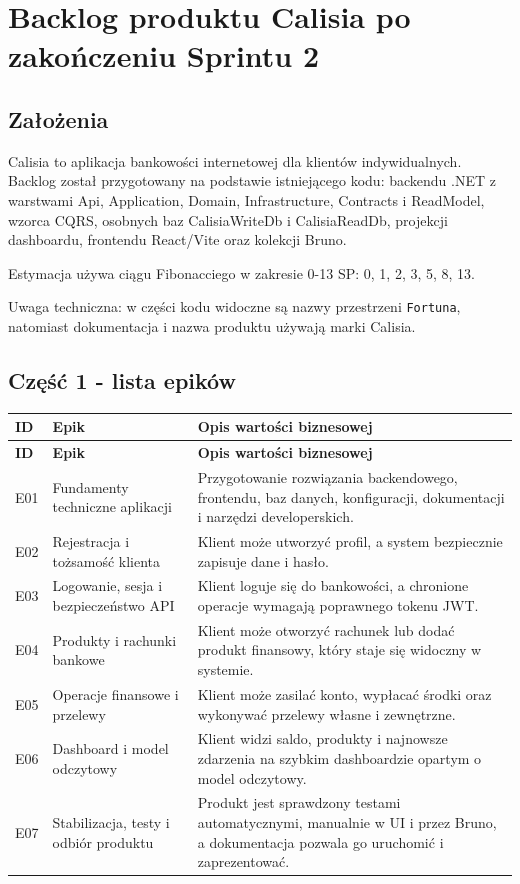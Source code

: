\documentclass[12pt,a4paper]{article}
\begin{document}
\section*{Backlog produktu Calisia po zakończeniu Sprintu 2}

\subsection*{Założenia}

Calisia to aplikacja bankowości internetowej dla klientów indywidualnych. Backlog został przygotowany na podstawie istniejącego kodu: backendu .NET z warstwami Api, Application, Domain, Infrastructure, Contracts i ReadModel, wzorca CQRS, osobnych baz CalisiaWriteDb i CalisiaReadDb, projekcji dashboardu, frontendu React/Vite oraz kolekcji Bruno.

Estymacja używa ciągu Fibonacciego w zakresie 0-13 SP: 0, 1, 2, 3, 5, 8, 13.

Uwaga techniczna: w części kodu widoczne są nazwy przestrzeni \texttt{Fortuna}, natomiast dokumentacja i nazwa produktu używają marki Calisia.

\subsection*{Część 1 - lista epików}

\begingroup
\footnotesize
{}
\begin{longtable}{@{}L{0.10\textwidth}L{0.27\textwidth}L{0.57\textwidth}@{}}
\toprule
{}
\textbf{ID} & \textbf{Epik} & \textbf{Opis wartości biznesowej} \\
\midrule
\endfirsthead
\toprule
{}
\textbf{ID} & \textbf{Epik} & \textbf{Opis wartości biznesowej} \\
\midrule
\endhead
E01 & Fundamenty techniczne aplikacji & Przygotowanie rozwiązania backendowego, frontendu, baz danych, konfiguracji, dokumentacji i narzędzi developerskich. \\
E02 & Rejestracja i tożsamość klienta & Klient może utworzyć profil, a system bezpiecznie zapisuje dane i hasło. \\
E03 & Logowanie, sesja i bezpieczeństwo API & Klient loguje się do bankowości, a chronione operacje wymagają poprawnego tokenu JWT. \\
E04 & Produkty i rachunki bankowe & Klient może otworzyć rachunek lub dodać produkt finansowy, który staje się widoczny w systemie. \\
E05 & Operacje finansowe i przelewy & Klient może zasilać konto, wypłacać środki oraz wykonywać przelewy własne i zewnętrzne. \\
E06 & Dashboard i model odczytowy & Klient widzi saldo, produkty i najnowsze zdarzenia na szybkim dashboardzie opartym o model odczytowy. \\
E07 & Stabilizacja, testy i odbiór produktu & Produkt jest sprawdzony testami automatycznymi, manualnie w UI i przez Bruno, a dokumentacja pozwala go uruchomić i zaprezentować. \\
\bottomrule
\end{longtable}
\endgroup
\end{document}
